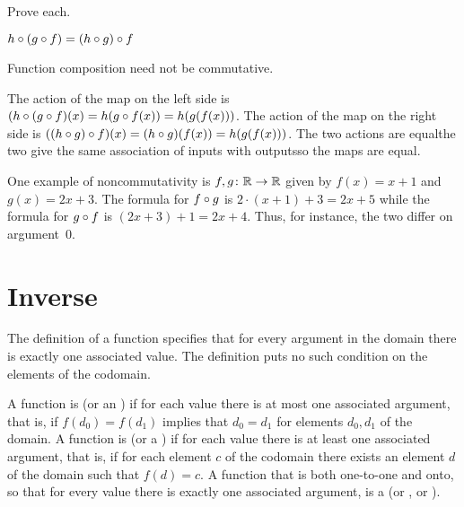 \documentclass{ibl}  %
\begin{document}
\begin{ex} Prove each.
\begin{exes}
\item{} 
  $h\mathbin{\circ} (g\mathbin{\circ} f)=(h\mathbin{\circ} g)\mathbin{\circ} f$    
\item Function composition need not be commutative.
\end{exes}
\begin{ans}
\begin{exes}
\item The action of the map on the left side
  is $(h\mathbin{\circ} (g\mathbin{\circ} f)(x)=h(g\mathbin{\circ} f(x))
       =h(g(f(x)))$.
  The action of the map on the right side  
  is $((h\mathbin{\circ} g)\mathbin{\circ} f)(x)=(h\mathbin{\circ} g)(f(x))
      =h(g(f(x)))$.
  The two actions are equal\Dash the two give the same association of inputs
  with outputs\Dash so the maps are equal.
\item One example of noncommutativity is $\mbox{$f,g\colon \mathbb{R}\to \mathbb{R}$}$ given by 
  $f(x)=x+1$ and $g(x)=2x+3$.
  The formula for $f\mathbin{\circ} g$ is $2\cdot(x+1)+3=2x+5$ while
  the formula for $g\mathbin{\circ} f$ is $(2x+3)+1=2x+4$.
  Thus, for instance, the two differ on argument~$0$.
\end{exes}
\end{ans}
\end{ex}





\section{Inverse}

The definition of a function specifies that for every argument in the
domain there is 
exactly one associated value.
The definition puts no such condition on the elements of the codomain.

\begin{df}
A function is  (or an ) 
if for each value there is at most
one associated argument, that is, if $f(d_0)=f(d_1)$ implies that $d_0=d_1$
for elements $d_0,d_1$ of the domain.
A function is  (or a ) 
if for each value there is at least
one associated argument, that is, if for each element $c$ of the codomain
there exists an element $d$ of the domain such that $f(d)=c$.
A function that is both one-to-one and onto, so that for every value there
is exactly one associated argument, is a 
 (or , or ).
\end{df}
\end{document}
